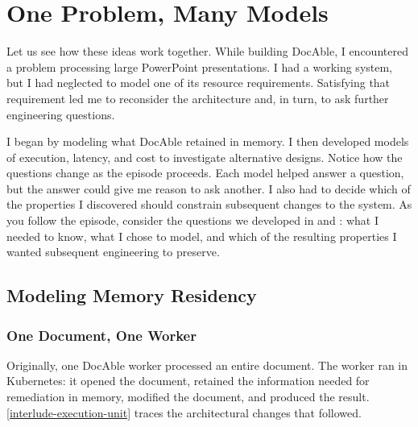 


\chapter{One Problem, Many Models}

Let us see how these ideas work together. While building DocAble, I encountered a problem processing large PowerPoint presentations. I had a working system, but I had neglected to model one of its resource requirements. Satisfying that requirement led me to reconsider the architecture and, in turn, to ask further engineering questions.

I began by modeling what DocAble retained in memory. I then developed models of execution, latency, and cost to investigate alternative designs. Notice how the questions change as the episode proceeds. Each model helped answer a question, but the answer could give me reason to ask another. I also had to decide which of the properties I discovered should constrain subsequent changes to the system. As you follow the episode, consider the questions we developed in  and : what I needed to know, what I chose to model, and which of the resulting properties I wanted subsequent engineering to preserve.

\section{Modeling Memory Residency}\label{heading:modeling-memory-residency}

\subsection{One Document, One Worker}\label{heading:one-document-one-worker}

Originally, one DocAble worker processed an entire document. The worker ran in Kubernetes: it opened the document, retained the information needed for remediation in memory, modified the document, and produced the result. \autoref{interlude-execution-unit} traces the architectural changes that followed.

